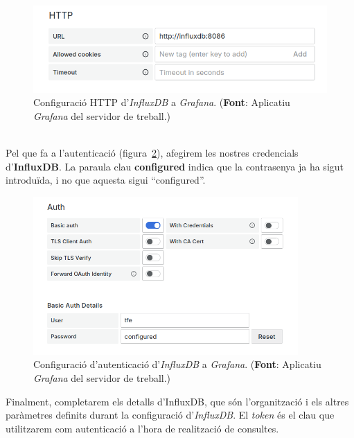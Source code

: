 \begin{figure}[htbp]
    \centerline{\includegraphics[width=\textwidth]{figures/grafana-influxdb-http}}
    \captionsetup{justification=centering}
    \caption[Configuració \gls{HTTP} d'\textit{InfluxDB} a \textit{Grafana}.]{Configuració \gls{HTTP} d'\textit{InfluxDB} a \textit{Grafana}. (\textbf{Font}: Aplicatiu \textit{Grafana} del servidor de treball.)}\label{fig:grafana-influxdb-http}
\end{figure}

\noindent \\
Pel que fa a l’autenticació (figura~\ref{fig:grafana-influxdb-auth}), afegirem les nostres credencials d’\textbf{InfluxDB}.
La paraula clau \textbf{configured} indica que la contrasenya ja ha sigut introduïda, i no que aquesta sigui ``configured''.

\begin{figure}[htbp]
    \centerline{\includegraphics[width=0.9\textwidth]{figures/grafana-influxdb-auth}}
    \captionsetup{justification=centering}
    \caption[Configuració d'autenticació d'\textit{InfluxDB} a \textit{Grafana}.]{Configuració d'autenticació d'\textit{InfluxDB} a \textit{Grafana}. (\textbf{Font}: Aplicatiu \textit{Grafana} del servidor de treball.)}\label{fig:grafana-influxdb-auth}
\end{figure}

\clearpage
\noindent
Finalment, completarem els detalls d’InfluxDB, que són l’organització i els altres paràmetres definits durant la configuració d’\textit{InfluxDB}.
El \textit{token} és el clau que utilitzarem com autenticació a l’hora de realització de consultes.


